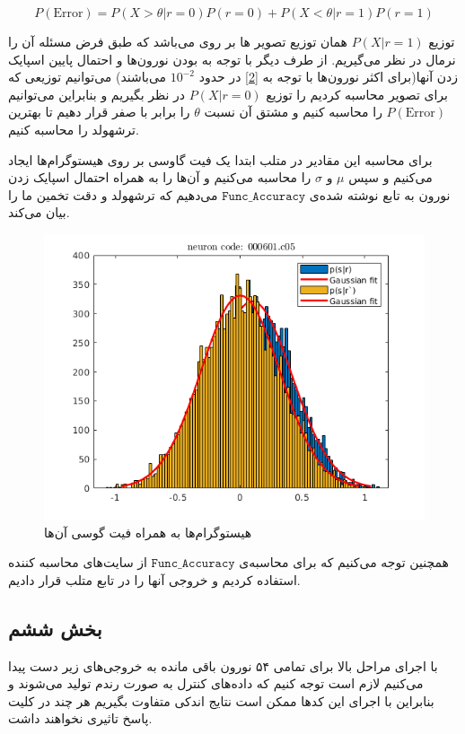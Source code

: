 \documentclass[12pt,onecolumn,a4paper,fleqn]{article}
\newcommand{\pf}[1]{$\mathtt{#1}$}
\begin{document}
$$ P(\text{Error}) = P(X > \theta | r = 0)P(r = 0) + P(X < \theta | r = 1)P(r = 1) $$

توزیع $P(X|r=1)$ همان توزیع تصویر  ها بر روی  می‌باشد که طبق فرض مسئله آن را نرمال در نظر می‌گیریم. از طرف دیگر با توجه به  بودن نورون‌ها و احتمال پایین اسپایک زدن آنها(برای اکثر نورون‌ها با توجه به \autoref{2} در حدود $10^{-2}$ می‌باشند) می‌توانیم توزیعی که برای تصویر  محاسبه کردیم را توزیع $P(X|r=0)$ در نظر بگیریم و بنابراین می‌توانیم $P(\text{Error})$ را محاسبه کنیم و مشتق آن نسبت $\theta$ را برابر با صفر قرار دهیم تا بهترین ترشهولد را محاسبه کنیم.

برای محاسبه این مقادیر در متلب ابتدا یک فیت گاوسی بر روی هیستوگرام‌ها ایجاد می‌کنیم و سپس $\mu$ و $\sigma$ را محاسبه می‌کنیم و آن‌ها را به همراه احتمال اسپایک زدن نورون به تابع نوشته شده‌ی
 \pf{Func\_Accuracy} می‌دهیم که ترشهولد و دقت تخمین ما را بیان می‌کند.

\begin{figure}[h]
	\centering
	\includegraphics[width=0.6\linewidth]{photos/sta-fit-gaussian.png}
	\caption{
هیستوگرام‌ها به همراه فیت گوسی آن‌ها
	}
	\label{1}
\end{figure}

همچنین توجه می‌کنیم که برای محاسبه‌ی 
\pf{Func\_Accuracy}
از سایت‌های محاسبه کننده استفاده کردیم و خروجی آنها را در تابع متلب قرار دادیم.
 
\pagebreak
		 
		 \subsection{بخش ششم}
		 با اجرای مراحل بالا برای تمامی ۵۴ نورون باقی مانده به خروجی‌های زیر دست پیدا می‌کنیم لازم است توجه کنیم که داده‌های کنترل به صورت رندم تولید می‌شوند و بنابراین با اجرای این کدها ممکن است نتایج اندکی متفاوت بگیریم هر چند در کلیت پاسخ تاثیری نخواهند داشت.
		 \setcounter{int}{1}
		 \loop
		 
\end{document}
